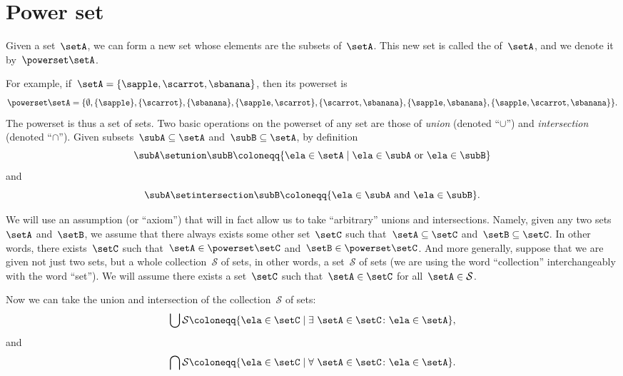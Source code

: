 \section{Power set}
\label{sec:power-set}

\begin{ctdefinition}
    \label{def:power-set}
    Given a set~$\setA$, we can form a new set whose elements are the subsets of~$\setA$.
    This new set is called the  of~$\setA$, and we denote it by~$\powerset \setA$.
\end{ctdefinition}

For example, if~$\setA = \{ \sapple, \scarrot, \sbanana \}$, then its powerset is
\begin{equation*}
    \powerset \setA = \{ \emptyset, \{ \sapple \}, \{ \scarrot \}, \{ \sbanana\}, \{ \sapple, \scarrot \}, \{ \scarrot, \sbanana \}, \{ \sapple, \sbanana\}, \{ \sapple, \scarrot, \sbanana \} \}.
\end{equation*}
The powerset is thus a set of sets.
Two basic operations on the powerset of any set are those of \emph{union} (denoted ``$\cup$'') and \emph{intersection} (denoted ``$\cap$'').
Given subsets~$\subA \subseteq \setA$ and~$\subB \subseteq \setA$, by definition
%
\begin{equation*}
    \subA \setunion \subB \coloneqq \{ \ela \in \setA \mid \ela \in \subA \text{ or } \ela \in \subB \}
\end{equation*}
%
and
%
\begin{equation*}
    \subA \setintersection \subB \coloneqq \{ \ela \in \subA \text{ and } \ela \in \subB \}.
\end{equation*}


We will use an assumption (or ``axiom'') that will in fact allow us to take ``arbitrary'' unions and intersections.
Namely, given any two sets~$\setA$ and~$\setB$, we assume that there always exists some other set~$\setC$ such that~$\setA \subseteq \setC$ and~$\setB \subseteq \setC$.
In other words, there exists~$\setC$ such that~$\setA \in \powerset \setC$ and~$\setB \in \powerset \setC$.
And more generally, suppose that we are given not just two sets, but a whole collection~$\mathcal{S}$ of sets, in other words, a set~$\mathcal{S}$ of sets (we are using the word ``collection'' interchangeably with the word ``set'').
We will assume there exists a set~$\setC$ such that~$\setA \in \setC$ for all~$\setA \in \mathcal{S}$.



Now we can take the union and intersection of the collection~$\mathcal{S}$ of sets:
%
\begin{equation*}
    \bigcup \mathcal{S} \coloneqq \{ \ela \in \setC \mid \exists \  \setA \in \setC \colon \ela \in \setA \},
\end{equation*}
%
and
%
\begin{equation*}
    \bigcap \mathcal{S} \coloneqq \{ \ela \in \setC \mid \forall \  \setA \in \setC \colon \ela \in \setA \}.
\end{equation*}

